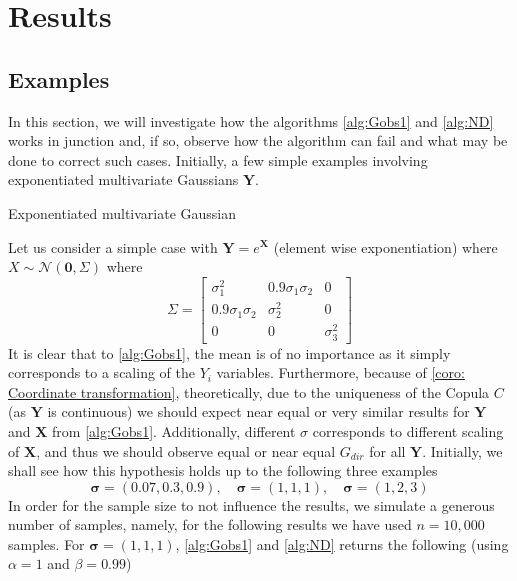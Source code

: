 \documentclass[../Thesis.tex]{subfiles}
\begin{document}
\chapter{Results}
\section{Examples}
In this section, we will investigate how the algorithms \autoref{alg:Gobs1} and \autoref{alg:ND} works in junction and, if so, observe how the algorithm can fail and what may be done to correct such cases. Initially, a few simple examples involving exponentiated multivariate Gaussians $\boldsymbol Y $.

\begin{example} \label{ex:1}
    Exponentiated multivariate Gaussian

    Let us consider a simple case with $\mathbf{Y} = e^{\mathbf{X}}$ (element wise exponentiation) where $X \sim \mathcal{N}\left(\mathbf{0}, \Sigma\right)$ where
    $$\Sigma = \begin{bmatrix}
            \sigma_1^2           & 0.9\sigma_1\sigma_2 & 0          \\
            0.9 \sigma_1\sigma_2 & \sigma_2^2          & 0          \\
            0                    & 0                   & \sigma_3^2
        \end{bmatrix}$$
    It is clear that to \autoref{alg:Gobs1}, the mean is of no importance as it simply corresponds to a scaling of the $Y_i$ variables. Furthermore, because of \autoref{coro: Coordinate transformation}, theoretically, due to the uniqueness of the Copula $C$ (as $\boldsymbol Y$ is continuous) we should expect near equal or very similar results for $\boldsymbol Y$ and $\boldsymbol X$ from \autoref{alg:Gobs1}. Additionally, different $\sigma$ corresponds to different scaling of $\boldsymbol X$, and thus we should observe equal or near equal $G_{dir}$ for all $\boldsymbol Y$. Initially, we shall see how this hypothesis holds up to the following three examples
    $$
        \boldsymbol\sigma = (0.07, 0.3, 0.9), \quad
        \boldsymbol\sigma = (1,1,1), \quad
        \boldsymbol\sigma = (1,2,3)
    $$
    In order for the sample size to not influence the results, we simulate a generous number of samples, namely, for the following results we have used $n = 10{,}000$ samples. For $\boldsymbol\sigma = (1,1,1)$, \autoref{alg:Gobs1} and \autoref{alg:ND} returns the following (using $\alpha = 1$ and $\beta = 0.99$)
    \begin{equation} \label{eq:s medium G_dir}

\end{equation}
\end{example}
\end{document}
